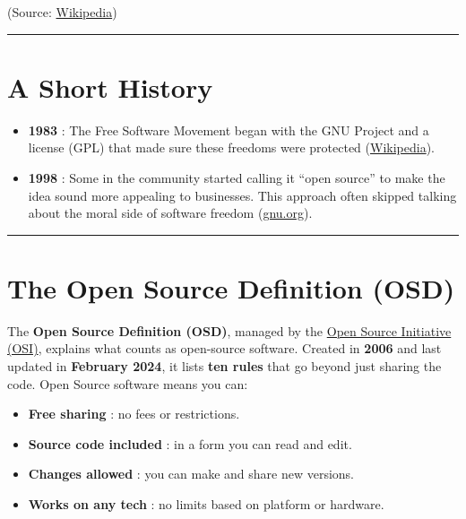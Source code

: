 \documentclass[
  11pt,
  letterpaper,
]{book}
\providecommand{\tightlist}{%
  \setlength{\itemsep}{0pt}\setlength{\parskip}{0pt}}
\begin{document}
(Source:
\href{https://en.wikipedia.org/wiki/The_Free_Software_Definition}{Wikipedia})

\begin{center}\rule{0.5\linewidth}{0.5pt}\end{center}

\section{A Short History}\label{a-short-history}

\begin{itemize}
\tightlist
\item
  \textbf{1983} : The Free Software Movement began with the GNU Project
  and a license (GPL) that made sure these freedoms were protected
  (\href{https://en.wikipedia.org/wiki/GNU_Project}{Wikipedia}).\\
\item
  \textbf{1998} : Some in the community started calling it ``open
  source'' to make the idea sound more appealing to businesses. This
  approach often skipped talking about the moral side of software
  freedom (\href{https://www.gnu.org}{gnu.org}).
\end{itemize}

\begin{center}\rule{0.5\linewidth}{0.5pt}\end{center}

\section{The Open Source Definition
(OSD)}\label{the-open-source-definition-osd}

The \textbf{Open Source Definition (OSD)}, managed by the
\href{https://opensource.org}{Open Source Initiative (OSI)}, explains
what counts as open-source software. Created in \textbf{2006} and last
updated in \textbf{February 2024}, it lists \textbf{ten rules} that go
beyond just sharing the code. Open Source software means you can:

\begin{itemize}
\tightlist
\item
  \textbf{Free sharing} : no fees or restrictions.\\
\item
  \textbf{Source code included} : in a form you can read and edit.\\
\item
  \textbf{Changes allowed} : you can make and share new versions.\\
\item
  \textbf{Works on any tech} : no limits based on platform or hardware.
\end{itemize}
\end{document}
